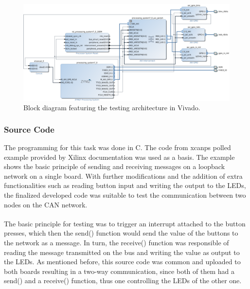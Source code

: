 \begin{figure}[h!]
	\centering
	\includegraphics[width = 0.9\linewidth]{graphics/Zybo_BasicTestingArchitecture_for_CAN}
	\caption{Block diagram featuring the testing architecture in Vivado.}
	\label{fig:CAN_Testing_Architecture}
\end{figure}

\subsubsection{Source Code}
The programming for this task was done in C.
The code from xcanps polled example provided by Xilinx documentation was used as a basis.
The example shows the basic principle of sending and receiving messages on a loopback network on a single board.
With further modifications and the addition of extra functionalities such as reading button input and writing the output to the LEDs, the finalized developed code was suitable to test the communication between two nodes on the CAN network.
\\\\
The basic principle for testing was to trigger an interrupt attached to the button presses, which then the send() function would send the value of the buttons to the network as a message.
In turn, the receive() function was responsible of reading the message transmitted on the bus and writing the value as output to the LEDs.
As mentioned before, this source code was common and uploaded to both boards resulting in a two-way communication, since both of them had a send() and a receive() function, thus one controlling the LEDs of the other one.

